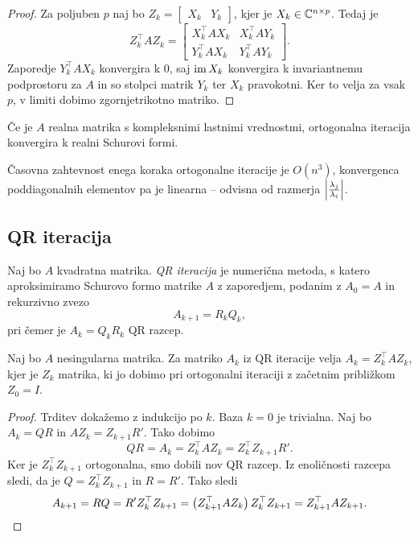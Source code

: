 \begin{proof}
Za poljuben $p$ naj bo $Z_k =
\begin{bmatrix}
X_k & Y_k
\end{bmatrix}$, kjer je $X_k \in \mathbb{C}^{n \times p}$. Tedaj je
\[
Z_k^\top A Z_k =
\begin{bmatrix}
X_k^\top A X_k & X_k^\top A Y_k \\
Y_k^\top A X_k & Y_k^\top A Y_k
\end{bmatrix}.
\]
Zaporedje $Y_k^\top A X_k$ konvergira k $0$, saj $\operatorname{im} X_k$
konvergira k invariantnemu podprostoru za $A$ in so stolpci matrik
$Y_k$ ter $X_k$ pravokotni. Ker to velja za vsak $p$, v limiti
dobimo zgornjetrikotno matriko.
\end{proof}

\begin{opomba}
Če je $A$ realna matrika s kompleksnimi lastnimi vrednostmi,
ortogonalna iteracija konvergira k realni Schurovi formi.
\end{opomba}

\begin{opomba}
Časovna zahtevnost enega koraka ortogonalne iteracije je $O(n^3)$,
konvergenca poddiagonalnih elementov pa je linearna -- odvisna od
razmerja $\left\lvert \frac{\lambda_j}{\lambda_i}\right\rvert$.
\end{opomba}

\newpage

\subsection{QR iteracija}

\begin{definicija}
Naj bo $A$ kvadratna matrika.
\emph{QR iteracija} je
numerična metoda, s katero aproksimiramo Schurovo formo matrike $A$
z zaporedjem, podanim z $A_0 = A$ in rekurzivno zvezo
\[
A_{k+1} = R_k Q_k,
\]
pri čemer je $A_k = Q_k R_k$ QR razcep.
\end{definicija}

\begin{izrek}
Naj bo $A$ nesingularna matrika. Za matriko $A_k$ iz QR iteracije
velja $A_k = Z_k^\top A Z_k$, kjer je $Z_k$ matrika, ki jo dobimo
pri ortogonalni iteraciji z začetnim približkom $Z_0 = I$.
\end{izrek}

\begin{proof}
Trditev dokažemo z indukcijo po $k$. Baza $k=0$ je trivialna. Naj
bo $A_k = QR$ in $AZ_k = Z_{k+1} R'$. Tako dobimo
\[
QR = A_k = Z_k^\top A Z_k = Z_k^\top Z_{k+1} R'.
\]
Ker je $Z_k^\top Z_{k+1}$ ortogonalna, smo dobili nov QR razcep. Iz
enoličnosti razcepa sledi, da je $Q = Z_k^\top Z_{k+1}$ in
$R = R'$. Tako sledi
\[
A_{k+1} = RQ = R' Z_k^\top Z_{k+1} =
\left(Z_{k+1}^\top A Z_k\right) Z_k^\top Z_{k+1} =
Z_{k+1}^\top A Z_{k+1}. \qedhere
\]
\end{proof}

